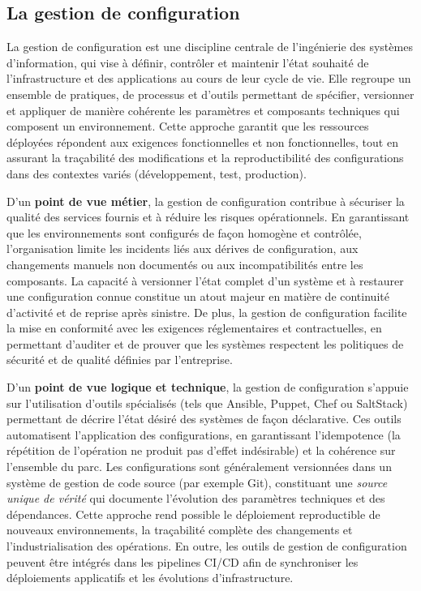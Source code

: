 \subsection{La gestion de configuration}

La gestion de configuration est une discipline centrale de l’ingénierie des systèmes d’information, qui vise à définir, contrôler et maintenir l’état souhaité de l’infrastructure et des applications au cours de leur cycle de vie. Elle regroupe un ensemble de pratiques, de processus et d’outils permettant de spécifier, versionner et appliquer de manière cohérente les paramètres et composants techniques qui composent un environnement. Cette approche garantit que les ressources déployées répondent aux exigences fonctionnelles et non fonctionnelles, tout en assurant la traçabilité des modifications et la reproductibilité des configurations dans des contextes variés (développement, test, production).

D’un \textbf{point de vue métier}, la gestion de configuration contribue à sécuriser la qualité des services fournis et à réduire les risques opérationnels. En garantissant que les environnements sont configurés de façon homogène et contrôlée, l’organisation limite les incidents liés aux dérives de configuration, aux changements manuels non documentés ou aux incompatibilités entre les composants. La capacité à versionner l’état complet d’un système et à restaurer une configuration connue constitue un atout majeur en matière de continuité d’activité et de reprise après sinistre. De plus, la gestion de configuration facilite la mise en conformité avec les exigences réglementaires et contractuelles, en permettant d’auditer et de prouver que les systèmes respectent les politiques de sécurité et de qualité définies par l’entreprise.

D’un \textbf{point de vue logique et technique}, la gestion de configuration s’appuie sur l’utilisation d’outils spécialisés (tels que Ansible, Puppet, Chef ou SaltStack) permettant de décrire l’état désiré des systèmes de façon déclarative. Ces outils automatisent l’application des configurations, en garantissant l’idempotence (la répétition de l’opération ne produit pas d’effet indésirable) et la cohérence sur l’ensemble du parc. Les configurations sont généralement versionnées dans un système de gestion de code source (par exemple Git), constituant une \textit{source unique de vérité} qui documente l’évolution des paramètres techniques et des dépendances. Cette approche rend possible le déploiement reproductible de nouveaux environnements, la traçabilité complète des changements et l’industrialisation des opérations. En outre, les outils de gestion de configuration peuvent être intégrés dans les pipelines CI/CD afin de synchroniser les déploiements applicatifs et les évolutions d’infrastructure.

